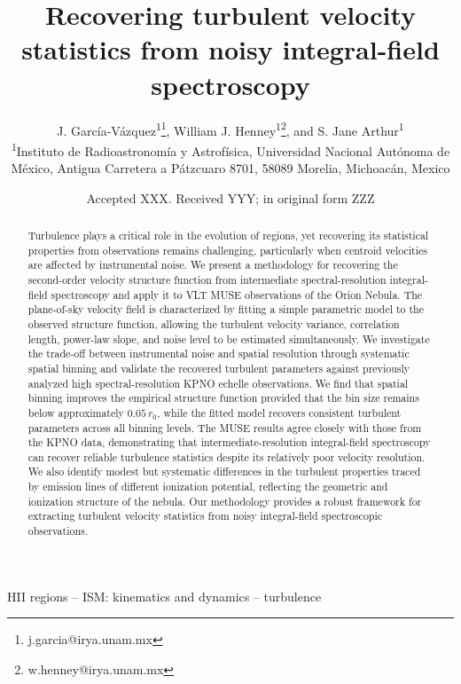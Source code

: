 \documentclass[fleqn,usenatbib, useAMS, a4paper]{mnras}
\title[Turbulent velocity statistics from IFUs]{Recovering turbulent velocity statistics from noisy integral-field spectroscopy}
\author[J. García-Vázquez et al.]{
  J. García-Vázquez\textsuperscript{1}\thanks{j.garcia@irya.unam.mx},
  William J. Henney\textsuperscript{1}\thanks{w.henney@irya.unam.mx},
  and S. Jane Arthur\textsuperscript{1}
  \\
  \textsuperscript{1}Instituto de Radioastronomía y Astrofísica,
    Universidad Nacional Autónoma de México,
    Antigua Carretera a Pátzcuaro 8701,
    58089 Morelia, Michoacán, Mexico\\
}
\date{Accepted XXX. Received YYY; in original form ZZZ}
\newcommand\hii{\ion{H}{II}}
\begin{document}
\label{firstpage}
\pagerange{\pageref{firstpage}--\pageref{lastpage}}
\maketitle

\begin{abstract}
Turbulence plays a critical role in the evolution of \hii{}
regions, yet recovering its statistical properties from observations
remains challenging, particularly when centroid velocities are
affected by instrumental noise. We present a methodology for
recovering the second-order velocity structure function from
intermediate spectral-resolution integral-field spectroscopy and
apply it to VLT MUSE observations of the Orion Nebula. The
plane-of-sky velocity field is characterized by fitting a simple
parametric model to the observed structure function, allowing the
turbulent velocity variance, correlation length, power-law slope,
and noise level to be estimated simultaneously. We investigate the
trade-off between instrumental noise and spatial resolution through
systematic spatial binning and validate the recovered turbulent
parameters against previously analyzed high spectral-resolution
KPNO echelle observations. We find that spatial binning improves
the empirical structure function provided that the bin size remains
below approximately \(0.05\,r_0\), while the fitted model recovers
consistent turbulent parameters across all binning levels. The MUSE
results agree closely with those from the KPNO data, demonstrating
that intermediate-resolution integral-field spectroscopy can recover
reliable turbulence statistics despite its relatively poor velocity
resolution. We also identify modest but systematic differences in
the turbulent properties traced by emission lines of different
ionization potential, reflecting the geometric and ionization
structure of the nebula. Our methodology provides a robust framework
for extracting turbulent velocity statistics from noisy
integral-field spectroscopic observations.
\end{abstract}


\begin{keywords}
HII regions -- ISM: kinematics and dynamics -- turbulence 
\end{keywords}



\end{document}
